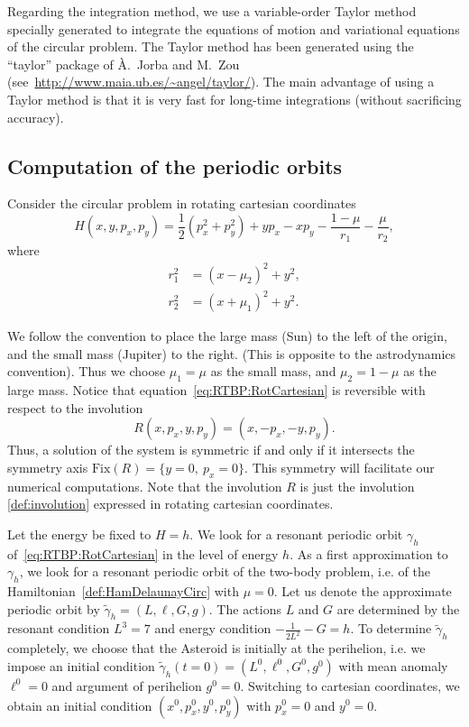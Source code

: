 Regarding the integration method, we use a variable-order Taylor method
specially generated to integrate the equations of motion and
variational equations of the circular problem.
The Taylor method has been generated using the ``taylor'' package of
\`{A}.~Jorba and M.~Zou
(see~\url{http://www.maia.ub.es/~angel/taylor/}).
The main advantage of using a Taylor method is that it is very fast
for long-time integrations (without sacrificing accuracy).

\subsection{Computation of the periodic
orbits}\label{sec:computation_periodic_orbits}
Consider the circular problem in rotating cartesian coordinates
\begin{equation}\label{eq:RTBP:RotCartesian}
  H(x,y,p_x,p_y)=\frac{1}{2}(p_x^2+p_y^2)+yp_x-xp_y-\frac{1-\mu}{r_1}-\frac{\mu}{r_2},
\end{equation}
where 
\begin{align*}
r_1^2 &= (x-\mu_2)^2 + y^2, \\
r_2^2 &= (x+\mu_1)^2 + y^2.
\end{align*}

We follow the convention to place the large mass (Sun) to the left of
the origin, and the small mass (Jupiter) to the right.
(This is opposite to the astrodynamics convention).
Thus we choose $\mu_1=\mu$ as the small mass, and $\mu_2=1-\mu$ as the
large mass.
Notice that equation~\eqref{eq:RTBP:RotCartesian} is reversible with
respect to the involution 
\begin{equation} \label{involutionCartesian}
R(x,p_x,y,p_y) = (x,-p_x,-y,p_y).
\end{equation}
Thus, a solution of the system is symmetric if and only if it
intersects the symmetry axis $\mathrm{Fix}(R) = \{y=0,\ p_x=0\}$.
This symmetry will facilitate our numerical computations. Note that the involution $R$ is just the involution \eqref{def:involution} expressed in rotating cartesian coordinates.

Let the energy be fixed to $H=h$. 
We look for a resonant periodic orbit $\gamma_h$
of~\eqref{eq:RTBP:RotCartesian} in the level of energy $h$.
As a first approximation to $\gamma_h$, we look for a resonant
periodic orbit of the two-body problem, i.e. of the
Hamiltonian~\eqref{def:HamDelaunayCirc} with $\mu=0$.
Let us denote the approximate periodic orbit by
$\tilde \gamma_h=(L,\ell,G,g)$. 
The actions $L$ and $G$ are determined by the resonant condition
$L^3=7$ and energy condition $-\frac{1}{2L^2}-G=h$. 
To determine $\tilde \gamma_h$ completely, we choose that the
Asteroid is initially at the perihelion, i.e. we impose an initial
condition $\tilde \gamma_h(t=0)=(L^0,\ell^0,G^0,g^0)$ with mean anomaly
$\ell^0=0$ and argument of perihelion $g^0=0$.
Switching to cartesian coordinates, we obtain an initial condition
$(x^0,p_x^0,y^0,p_y^0)$ with $p_x^0=0$ and $y^0=0$.

